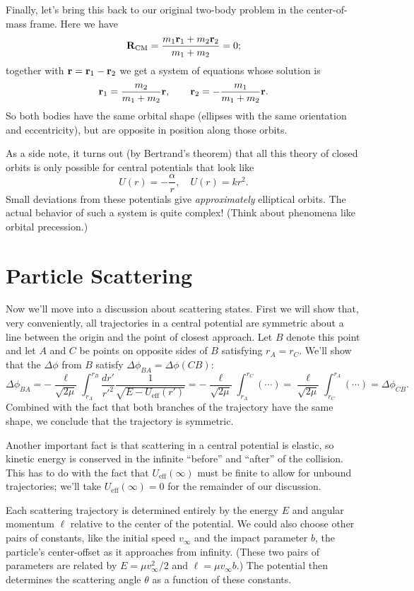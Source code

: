 \documentclass[../p111main.tex]{subfiles}
\begin{document}
Finally, let's bring this back to our original two-body problem in the center-of-mass frame.
Here we have
\[ \mathbf{R}_\textrm{CM} = \frac{m_1 \mathbf{r}_1 + m_2 \mathbf{r}_2}{m_1 + m_2} = 0; \]
together with $\mathbf{r} = \mathbf{r}_1 - \mathbf{r}_2$ we get a system of equations whose solution is
\[ \mathbf{r}_1 = \frac{m_2}{m_1 + m_2} \mathbf{r}, \qquad \mathbf{r}_2 = -\frac{m_1}{m_1 + m_2} \mathbf{r}. \]
So both bodies have the same orbital shape (ellipses with the same orientation and eccentricity), but are opposite in position along those orbits.

As a side note, it turns out (by Bertrand's theorem) that all this theory of closed orbits is only possible for central potentials that look like
\[ U(r) = -\frac{\alpha}{r}, \quad U(r) = kr^2. \]
Small deviations from these potentials give \textit{approximately} elliptical orbits.
The actual behavior of such a system is quite complex!
(Think about phenomena like orbital precession.)

\section{Particle Scattering}
Now we'll move into a discussion about scattering states.
First we will show that, very conveniently, all trajectories in a central potential are symmetric about a line between the origin and the point of closest approach.
Let $B$ denote this point and let $A$ and $C$ be points on opposite sides of $B$ satisfying $r_A = r_C$.
We'll show that the $\Delta \phi$ from $B$ satisfy $\Delta \phi_{BA} = \Delta \phi(CB)$:
\[ \Delta \phi_{BA} = -\frac{\ell}{\sqrt{2\mu}} \int_{r_A}^{r_B} \frac{dr'}{r'^2} \frac{1}{\sqrt{E - U_\textrm{eff}(r')}} = -\frac{\ell}{\sqrt{2\mu}} \int_{r_A}^{r_C} (\cdots) = \frac{\ell}{\sqrt{2\mu}} \int_{r_C}^{r_A} (\cdots) = \Delta \phi_{CB}. \]
Combined with the fact that both branches of the trajectory have the same shape, we conclude that the trajectory is symmetric.

Another important fact is that scattering in a central potential is elastic, so kinetic energy is conserved in the infinite ``before'' and ``after'' of the collision.
This has to do with the fact that $U_\textrm{eff}(\infty)$ must be finite to allow for unbound trajectories; we'll take $U_\textrm{eff}(\infty) = 0$ for the remainder of our discussion.

Each scattering trajectory is determined entirely by the energy $E$ and angular momentum $\ell$ relative to the center of the potential.
We could also choose other pairs of constants, like the initial speed $v_\infty$ and the impact parameter $b$, the particle's center-offset as it approaches from infinity.
(These two pairs of parameters are related by $E = \mu v_\infty^2 / 2$ and $\ell = \mu v_\infty b$.)
The potential then determines the scattering angle $\theta$ as a function of these constants.
\end{document}
